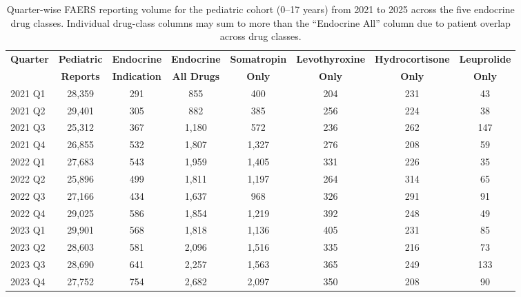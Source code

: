 \documentclass[10pt,twocolumn]{article}
\begin{document}
\begin{table}[!t]
\caption{Quarter-wise FAERS reporting volume for the pediatric cohort (0--17 years) from 2021 to 2025 across the five endocrine drug classes. Individual drug-class columns may sum to more than the ``Endocrine All'' column due to patient overlap across drug classes.}
\label{tab:cohort_counts}
\centering\small\setlength{\tabcolsep}{4pt}
\begin{tabular}{|l|c|c|c|c|c|c|c|}
\hline
\rowcolor{tableHead}
\color{white}\textbf{Quarter} &
\color{white}\textbf{Pediatric} &
\color{white}\textbf{Endocrine} &
\color{white}\textbf{Endocrine} &
\color{white}\textbf{Somatropin} &
\color{white}\textbf{Levothyroxine} &
\color{white}\textbf{Hydrocortisone} &
\color{white}\textbf{Leuprolide}\\
\rowcolor{tableHead}
\color{white}\textbf{} &
\color{white}\textbf{Reports} &
\color{white}\textbf{Indication} &
\color{white}\textbf{All Drugs} &
\color{white}\textbf{Only} &
\color{white}\textbf{Only} &
\color{white}\textbf{Only} &
\color{white}\textbf{Only}\\
\hline
\rowcolor{rowA} 2021 Q1 & 28,359 & 291 & 855 & 400 & 204 & 231 & 43\\
\hline
\rowcolor{rowB} 2021 Q2 & 29,401 & 305 & 882 & 385 & 256 & 224 & 38\\
\hline
\rowcolor{rowA} 2021 Q3 & 25,312 & 367 & 1,180 & 572 & 236 & 262 & 147\\
\hline
\rowcolor{rowB} 2021 Q4 & 26,855 & 532 & 1,807 & 1,327 & 276 & 208 & 59\\
\hline
\rowcolor{rowA} 2022 Q1 & 27,683 & 543 & 1,959 & 1,405 & 331 & 226 & 35\\
\hline
\rowcolor{rowB} 2022 Q2 & 25,896 & 499 & 1,811 & 1,197 & 264 & 314 & 65\\
\hline
\rowcolor{rowA} 2022 Q3 & 27,166 & 434 & 1,637 & 968 & 326 & 291 & 91\\
\hline
\rowcolor{rowB} 2022 Q4 & 29,025 & 586 & 1,854 & 1,219 & 392 & 248 & 49\\
\hline
\rowcolor{rowA} 2023 Q1 & 29,901 & 568 & 1,818 & 1,136 & 405 & 231 & 85\\
\hline
\rowcolor{rowB} 2023 Q2 & 28,603 & 581 & 2,096 & 1,516 & 335 & 216 & 73\\
\hline
\rowcolor{rowA} 2023 Q3 & 28,690 & 641 & 2,257 & 1,563 & 365 & 249 & 133\\
\hline
\rowcolor{rowB} 2023 Q4 & 27,752 & 754 & 2,682 & 2,097 & 350 & 208 & 90\\
\hline

\end{tabular}
\end{table}
\end{document}
